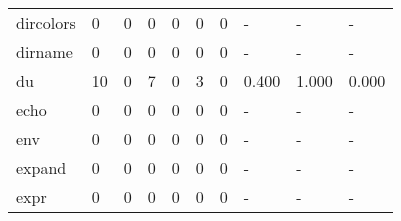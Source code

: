 \begin{longtable}{lp{1.3cm}p{1.3cm}p{1.3cm}p{1.3cm}p{1.3cm}p{1.3cm}p{1.3cm}p{1.3cm}p{1.3cm}}
dircolors &                      0 &                                  0 &                                 0 &                                0 &                                 0 &                               0 &                                    - &                                      - &                                    - \\
dirname   &                      0 &                                  0 &                                 0 &                                0 &                                 0 &                               0 &                                    - &                                      - &                                    - \\
du        &                     10 &                                  0 &                                 7 &                                0 &                                 3 &                               0 &                                0.400 &                                  1.000 &                                0.000 \\
echo      &                      0 &                                  0 &                                 0 &                                0 &                                 0 &                               0 &                                    - &                                      - &                                    - \\
env       &                      0 &                                  0 &                                 0 &                                0 &                                 0 &                               0 &                                    - &                                      - &                                    - \\
expand    &                      0 &                                  0 &                                 0 &                                0 &                                 0 &                               0 &                                    - &                                      - &                                    - \\
expr      &                      0 &                                  0 &                                 0 &                                0 &                                 0 &                               0 &                                    - &                                      - &                                    - \\

\end{longtable}
